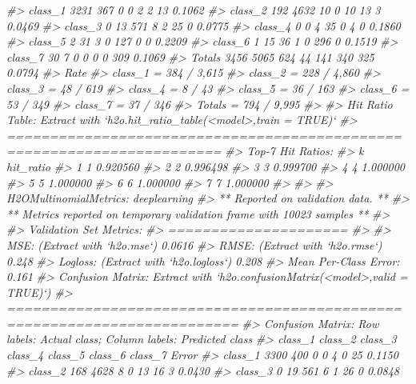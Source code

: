 \documentclass[]{book}
\newenvironment{Shaded}{\begin{snugshade}}{\end{snugshade}}
\newcommand{\CommentTok}[1]{\textcolor[rgb]{0.56,0.35,0.01}{\textit{#1}}}
\begin{document}
\begin{Shaded}
\begin{Highlighting}[]
{{{{{{{{{{{{{{{{{{{{{{{{{{{{{{{{{{{{{{{{{\CommentTok{#> class_1    3231     367       0       0       2       2      13 0.1062}
\CommentTok{#> class_2     192    4632      10       0      10      13       3 0.0469}
\CommentTok{#> class_3       0      13     571       8       2      25       0 0.0775}
\CommentTok{#> class_4       0       0       4      35       0       4       0 0.1860}
\CommentTok{#> class_5       2      31       3       0     127       0       0 0.2209}
\CommentTok{#> class_6       1      15      36       1       0     296       0 0.1519}
\CommentTok{#> class_7      30       7       0       0       0       0     309 0.1069}
\CommentTok{#> Totals     3456    5065     624      44     141     340     325 0.0794}
\CommentTok{#>                  Rate}
\CommentTok{#> class_1 = 384 / 3,615}
\CommentTok{#> class_2 = 228 / 4,860}
\CommentTok{#> class_3 =    48 / 619}
\CommentTok{#> class_4 =      8 / 43}
\CommentTok{#> class_5 =    36 / 163}
\CommentTok{#> class_6 =    53 / 349}
\CommentTok{#> class_7 =    37 / 346}
\CommentTok{#> Totals  = 794 / 9,995}
\CommentTok{#> }
\CommentTok{#> Hit Ratio Table: Extract with `h2o.hit_ratio_table(<model>,train = TRUE)`}
\CommentTok{#> =======================================================================}
\CommentTok{#> Top-7 Hit Ratios: }
\CommentTok{#>   k hit_ratio}
\CommentTok{#> 1 1  0.920560}
\CommentTok{#> 2 2  0.996498}
\CommentTok{#> 3 3  0.999700}
\CommentTok{#> 4 4  1.000000}
\CommentTok{#> 5 5  1.000000}
\CommentTok{#> 6 6  1.000000}
\CommentTok{#> 7 7  1.000000}
\CommentTok{#> }
\CommentTok{#> }
\CommentTok{#> H2OMultinomialMetrics: deeplearning}
\CommentTok{#> ** Reported on validation data. **}
\CommentTok{#> ** Metrics reported on temporary validation frame with 10023 samples **}
\CommentTok{#> }
\CommentTok{#> Validation Set Metrics: }
\CommentTok{#> =====================}
\CommentTok{#> }
\CommentTok{#> MSE: (Extract with `h2o.mse`) 0.0616}
\CommentTok{#> RMSE: (Extract with `h2o.rmse`) 0.248}
\CommentTok{#> Logloss: (Extract with `h2o.logloss`) 0.208}
\CommentTok{#> Mean Per-Class Error: 0.161}
\CommentTok{#> Confusion Matrix: Extract with `h2o.confusionMatrix(<model>,valid = TRUE)`)}
\CommentTok{#> =========================================================================}
\CommentTok{#> Confusion Matrix: Row labels: Actual class; Column labels: Predicted class}
\CommentTok{#>         class_1 class_2 class_3 class_4 class_5 class_6 class_7  Error}
\CommentTok{#> class_1    3300     400       0       0       4       0      25 0.1150}
\CommentTok{#> class_2     168    4628       8       0      13      16       3 0.0430}
\CommentTok{#> class_3       0      19     561       6       1      26       0 0.0848}
}}}}}}}}}}}}}}}}}}}}}}}}}}}}}}}}}}}}}}}}}
\end{Highlighting}
\end{Shaded}
\end{document}
